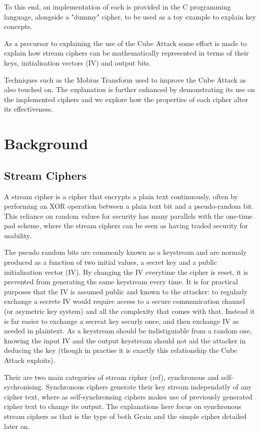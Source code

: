 \documentclass{report}
\begin{document}
To this end, an implementation of each is provided in the C programming language, alongside a "dummy" cipher, to be used as a toy example to explain key concepts.

As a precursor to explaining the use of the Cube Attack some effort is made to explain how stream ciphers can be mathematically represented in terms of their keys, initialisation vectors (IV) and output bits.

Techniques such as the Mobius Transform used to improve the Cube Attack as also touched on. The explanation is further enhanced by demonstrating its use on the implemented ciphers and we explore how the properties of each cipher alter its effectiveness.

\chapter{Background}
\section{Stream Ciphers}
A stream cipher is a cipher that encrypts a plain text continuously, often by performing an XOR operation between a plain text bit and a pseudo-random bit. This reliance on random values for security has many parallels with the one-time pad scheme, where the stream ciphers can be seen as having traded security for usability.

The pseudo random bits are commonly known as a keystream and are normaly produced as a function of two initial values, a secret key and a public initialisation vector (IV). By changing the IV everytime the cipher is reset, it is prevented from generating the same keystream every time. It is for practical purposes that the IV is assumed public and known to the attacker: to regularly exchange a secrete IV would require access to a secure communication channel (or asymetric key system) and all the complexity that comes with that. Instead it is far easier to exchange a secreat key securly once, and then exchange IV as needed in plaintext. As a keystream should be indistiguiable from a random one, knowing the input IV and the output keystream should not aid the attacker in deducing the key (though in practise it is exactly this relationship the Cube Attack exploits).

Their are two main categories of stream cipher (ref), synchronous and self-sychronising. Synchronous ciphers generate their key stream independatly of any cipher text, where as self-synchronsing ciphers makes use of previously generated cipher text to change its output. The explanations here focus on synchronous stream ciphers as that is the type of both Grain and the simple cipher detailed later on.
 
\end{document}
